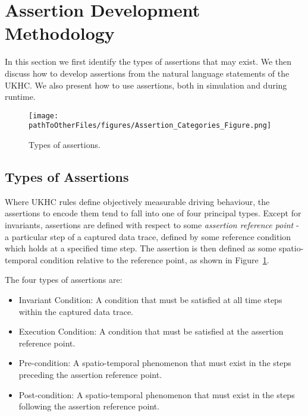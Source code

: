 \section{Assertion Development Methodology}\label{Use_of_assertions}
In this section we first identify the types of assertions that may exist. We then discuss how to develop assertions from the natural language statements of the UKHC. We also present how to use assertions, both in simulation and during runtime.

\begin{figure}[!b]
    \centering
    \texttt{[image: \\pathToOtherFiles/figures/Assertion\_Categories\_Figure.png]}
    \caption{Types of assertions.}
    \label{fig:categories_of_assertions}
\end{figure}


\subsection{Types of Assertions} \label{assertion_categories}
Where UKHC rules define objectively measurable driving behaviour, the assertions to encode them tend to fall into one of four principal types. Except for invariants, assertions are defined with respect to some \emph{assertion reference point} - a particular step of a captured data trace, defined by some reference condition which holds at a specified time step. The assertion is then defined as some spatio-temporal condition relative to the reference point, as shown in Figure~\ref{fig:categories_of_assertions}.


The four types of assertions are:
\begin{itemize}
    \item Invariant Condition: A condition that must be satisfied at all time steps within the captured data trace.
    \item Execution Condition: A condition that must be satisfied at the assertion reference point.
    \item Pre-condition: A spatio-temporal phenomenon that must exist in the steps preceding the assertion reference point. 
    \item Post-condition: A spatio-temporal phenomenon that must exist in the steps following the assertion reference point.
\end{itemize}


